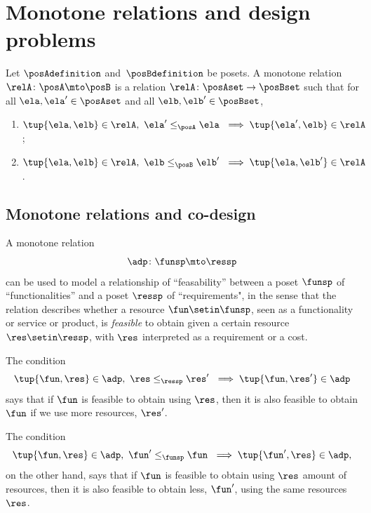 
\section{Monotone relations and design problems}




\begin{definition}
Let $\posAdefinition$ and~$\posBdefinition$ be posets. A monotone relation $\relA \colon \posA \mto \posB$ is a relation $\relA \colon \posAset \to \posBset$ such that for all $\ela, \ela' \in \posAset$ and all $\elb, \elb' \in \posBset$, 
\begin{enumerate}
\item $\tup{\ela, \elb} \in \relA, \ \ela' \leq_{\posA} \ela \ \implies \tup{\ela', \elb} \in \relA$;
\item $\tup{\ela, \elb} \in \relA, \ \elb \leq_{\posB} \elb' \ \implies \tup{\ela, \elb'} \in \relA$.
\end{enumerate}
\end{definition}

\subsection{Monotone relations and co-design}

A monotone relation
\begin{equation}
\adp \colon \funsp \mto \ressp
\end{equation}
can be used to model a relationship of ``feasability'' between a poset $\funsp$ of ``functionalities'' and a poset $\ressp$ of ``requirements", in the sense that the relation describes whether a resource $\fun \setin \funsp$, seen as a functionality or service or product, is \emph{feasible} to obtain given a certain resource $\res \setin \ressp$, with $\res$ interpreted as a requirement or a cost.

The condition
\begin{equation}\label{eq:mon-rel-cond-1}
\tup{\fun, \res} \in \adp, \ \res \leq_{\ressp} \res' \ \implies \tup{\fun, \res'} \in \adp
\end{equation}
says that if $\fun$ is feasible to obtain using $\res$, then it is also feasible to obtain $\fun$ if we use more resources, $\res'$. 

The condition
\begin{equation}\label{eq:mon-rel-cond-2}
\tup{\fun, \res} \in \adp, \ \fun' \leq_{\funsp} \fun \ \implies \tup{\fun', \res} \in \adp,
\end{equation}
on the other hand, says that if $\fun$ is feasible to obtain using $\res$ amount of resources, then it is also feasible to obtain less, $\fun'$, using the same resources $\res$. 



